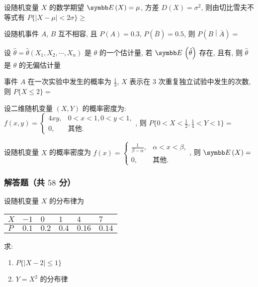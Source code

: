 \begin{ti}
	设随机变量 $X$ 的数学期望 $\EE(X)=\mu$, 方差 $D(X)=\sigma^2$, 则由切比雪夫不等式有 $P\{ |X-\mu|<2\sigma \} \geq$\hua{}
\end{ti}

\begin{ti}
	设随机事件 $A$, $B$ 互不相容, 且 $P(A)=0.3$, $P\left( \overline{B} \right)=0.5$, 则 $P\left( B\middle|\overline{A} \right)=$\hua{}
\end{ti}

\begin{ti}
	设 $\hat{\theta}=\hat{\theta}(X_1,X_2,\cdots,X_n)$ 是 $\theta$ 的一个估计量, 若 $\EE\left( \hat{\theta} \right)$ 存在, 且有\hua{}, 则 $\hat{\theta}$ 是 $\theta$ 的无偏估计量
\end{ti}

\begin{ti}
	事件 $A$ 在一次实验中发生的概率为 $\frac{1}{3}$, $X$ 表示在 $3$ 次重复独立试验中发生的次数, 则 $P\{ X\leqslant 2 \}=$\hua{}
\end{ti}

\begin{ti}
	设二维随机变量 $(X,Y)$ 的概率密度为: $f(x,y)=
	\begin{cases}
		4xy, & 0<x<1,0<y<1,\\
		0, & \text{其他}.
	\end{cases}
	$, 则 $P\bigl\{ 0<X<\frac{1}{2},\frac{1}{4}<Y<1 \bigr\}=$ \hua{}
\end{ti}

\begin{ti}
	设随机变量 $X$ 的概率密度为 $f(x)=
	\begin{cases}
		\frac{1}{\beta-\alpha}, & \alpha<x<\beta,\\
		0, & \text{其他}.
	\end{cases}
	$, 则 $\EE(X)=$ \hua{}
\end{ti}

\subsubsection{解答题（共 $58$ 分）}
\begin{ti}[$8$ 分]
	设随机变量 $X$ 的分布律为
	\begin{center}
		\begin{tabularx}{0.8\textwidth}{Z|ZZZZZ}
			$X$ & $-1$ & $0$ & $1$ & $4$ & $7$\\
			\hline
			$P$ & $0.1$ & $0.2$ & $0.4$ & $0.16$ & $0.14$
		\end{tabularx}
	\end{center}
	求:
	\begin{enumerate}
		\item $P\{ |X-2|\leqslant 1 \}$
		\item $Y=X^2$ 的分布律
	\end{enumerate}
\end{ti}

